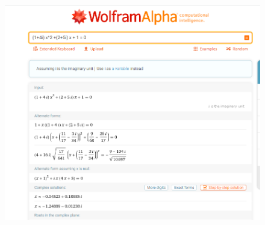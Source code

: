 \documentclass[12pt,a4paper]{article}
\begin{document}
\begin{figure}
    \includegraphics[scale = 0.7]{3.PNG}

\end{figure}
\end{document}
